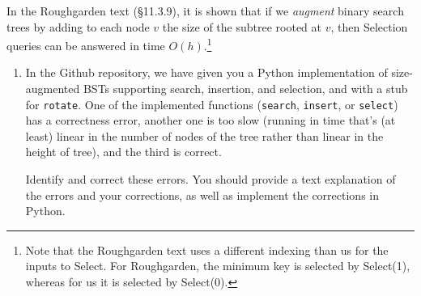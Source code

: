 \documentclass[11pt]{article}
\begin{document}
\begin{enumerate}
    In the Roughgarden text (\S11.3.9), it is shown that if we {\em augment} binary search trees by adding to each node $v$ the size of the subtree rooted at $v$, then Selection queries can be answered in time $O(h)$.\footnote{Note that the Roughgarden text uses a different indexing than us for the inputs to Select. For Roughgarden, the minimum key is selected by Select(1), whereas for us it is selected by Select(0).}
    
    \begin{enumerate}
        \item In the Github repository, we have given you a Python implementation of size-augmented BSTs supporting search, insertion, and selection, and with a stub for \texttt{rotate}. One of the implemented functions (\texttt{search}, \texttt{insert}, or \texttt{select}) has a correctness error, another one is too slow (running in time that's (at least) linear in the number of nodes of the tree rather than linear in the height of tree), and the third is correct. 

        Identify and correct these errors. You should provide a text explanation of the errors and your corrections, as well as implement the corrections in Python.


\end{enumerate}
\end{enumerate}
\end{document}
